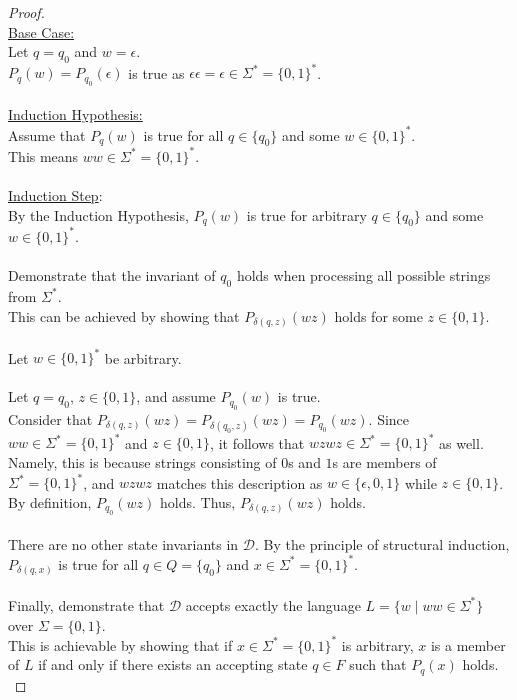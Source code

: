 \documentclass[12pt]{article}
\begin{document}
\begin{proof}
    \\
    \underline{Base Case:} \\
    Let $q = q_0$ and $w = \epsilon$. \\
    $P_q(w) = P_{q_0}(\epsilon)$ is true as $\epsilon \epsilon = \epsilon \in \Sigma^* = \{0, 1\}^*$. \\
    \\
    \underline{Induction Hypothesis:} \\
    Assume that $P_q(w)$ is true for all $q \in \{q_0\}$ and some $w \in \{0, 1\}^*$. \\
    This means $ww \in \Sigma^* = \{0, 1\}^*$. \\
    \\
    \underline{Induction Step}: \\
    By the Induction Hypothesis, $P_q(w)$ is true for arbitrary $q \in \{q_0\}$ and some $w \in \{0, 1\}^*$. \\
    \\
    Demonstrate that the invariant of $q_0$ holds when processing all possible strings from $\Sigma^*$. \\
    This can be achieved by showing that $P_{\delta(q, z)}(wz)$ holds for some $z \in \{0, 1\}$. \\
    \\
    Let $w \in \{0, 1\}^*$ be arbitrary. \\
    \\
    Let $q = q_0$, $z \in \{0, 1\}$, and assume $P_{q_0}(w)$ is true. \\
    Consider that $P_{\delta(q, z)}(wz) = P_{\delta(q_0, z)}(wz) = P_{q_0}(wz)$. Since $ww \in \Sigma^* = \{0, 1\}^*$ and $z \in \{0, 1\}$, it follows that $wzwz \in \Sigma^* = \{0, 1\}^*$ as well. Namely, this is because strings consisting of $0$s and $1$s are members of $\Sigma^* = \{0, 1\}^*$, and $wzwz$ matches this description as $w \in \{\epsilon, 0, 1\}$ while $z \in \{0, 1\}$. By definition, $P_{q_0}(wz)$ holds. Thus, $P_{\delta(q, z)}(wz)$ holds. \\
    \\
    There are no other state invariants in $\mathcal{D}$. By the principle of structural induction, $P_{\delta(q, x)}$ is true for all $q \in Q = \{q_0\}$ and $x \in \Sigma^* = \{0, 1\}^*$. \\
    \\
    Finally, demonstrate that $\mathcal{D}$ accepts exactly the language $L = \{ w \mid ww \in \Sigma^* \}$ over $\Sigma = \{0, 1\}$. \\
    This is achievable by showing that if $x \in \Sigma^* = \{0, 1\}^*$ is arbitrary, $x$ is a member of $L$ if and only if there exists an accepting state $q \in F$ such that $P_q(x)$ holds. \\

\end{proof}
\end{document}
